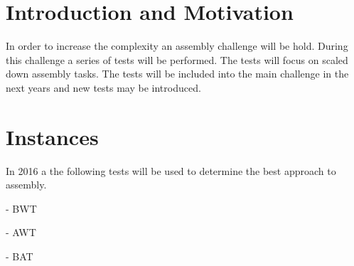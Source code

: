 \section{Introduction and Motivation}
In order to increase the complexity an assembly challenge will be hold. During this challenge a series of tests will be performed. The tests will focus on scaled down assembly tasks. The tests will be included into the main challenge in the next years and new tests may be introduced.

\section{Instances}

In 2016 a the following tests will be used to determine the best approach to assembly.

- BWT

- AWT

- BAT










